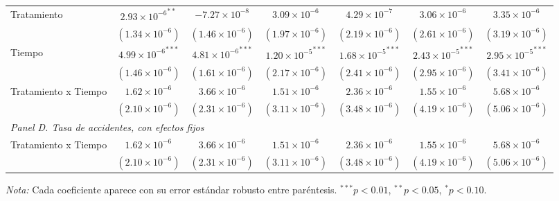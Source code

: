 \begin{table}[htbp]
\begin{adjustbox}{max width=\textwidth}
\begin{tabular}{lcccccc}
        Tratamiento & ${2.93 \times 10^{-6}}^{**}$ & $-7.27 \times 10^{-8}$ & $3.09 \times 10^{-6}$ & $4.29 \times 10^{-7}$ & $3.06 \times 10^{-6}$ & $3.35 \times 10^{-6}$ \\
         & $(1.34 \times 10^{-6})$ & $(1.46 \times 10^{-6})$ & $(1.97 \times 10^{-6})$ & $(2.19 \times 10^{-6})$ & $(2.61 \times 10^{-6})$ & $(3.19 \times 10^{-6})$ \\
        Tiempo & ${4.99 \times 10^{-6}}^{***}$ & ${4.81 \times 10^{-6}}^{***}$ & ${1.20 \times 10^{-5}}^{***}$ & ${1.68 \times 10^{-5}}^{***}$ & ${2.43 \times 10^{-5}}^{***}$ & ${2.95 \times 10^{-5}}^{***}$ \\
         & $(1.46 \times 10^{-6})$ & $(1.61 \times 10^{-6})$ & $(2.17 \times 10^{-6})$ & $(2.41 \times 10^{-6})$ & $(2.95 \times 10^{-6})$ & $(3.41 \times 10^{-6})$ \\
        Tratamiento x Tiempo & $1.62 \times 10^{-6}$ & $3.66 \times 10^{-6}$ & $1.51 \times 10^{-6}$ & $2.36 \times 10^{-6}$ & $1.55 \times 10^{-6}$ & $5.68 \times 10^{-6}$ \\
         & $(2.10 \times 10^{-6})$ & $(2.31 \times 10^{-6})$ & $(3.11 \times 10^{-6})$ & $(3.48 \times 10^{-6})$ & $(4.19 \times 10^{-6})$ & $(5.06 \times 10^{-6})$ \\
        \midrule
        \multicolumn{7}{l}{\textit{Panel D. Tasa de accidentes, con efectos fijos}} \\
        Tratamiento x Tiempo & $1.62 \times 10^{-6}$ & $3.66 \times 10^{-6}$ & $1.51 \times 10^{-6}$ & $2.36 \times 10^{-6}$ & $1.55 \times 10^{-6}$ & $5.68 \times 10^{-6}$ \\
         & $(2.10 \times 10^{-6})$ & $(2.31 \times 10^{-6})$ & $(3.11 \times 10^{-6})$ & $(3.48 \times 10^{-6})$ & $(4.19 \times 10^{-6})$ & $(5.06 \times 10^{-6})$ \\
        \bottomrule
    \end{tabular}
    \end{adjustbox}

    \vspace{0.4em}
    \begin{minipage}{0.93\textwidth}
        \tiny \textit{Nota:} Cada coeficiente aparece con su error estándar robusto entre paréntesis. ${}^{***} p<0.01$, ${}^{**} p<0.05$, ${}^{*} p<0.10$.
    \end{minipage}
\end{table}

